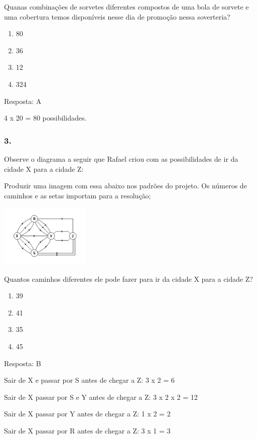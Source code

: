 Quanas combinações de sorvetes diferentes compostos de uma bola de
sorvete e uma cobertura temos disponíveis nesse dia de promoção nessa
soverteria?

\begin{enumerate}
\def\labelenumi{\alph{enumi})}
\item
  80
\item
  36
\item
  12
\item
  324
\end{enumerate}

Resposta: A

4 x 20 = 80 possibilidades.

\subsubsection{3.}\label{section-142}

Observe o diagrama a seguir que Rafael criou com as possibilidades de ir
da cidade X para a cidade Z:

Produzir uma imagem com essa abaixo nos padrões do projeto. \textbar{}Os
números de caminhos e as setas importam para a resolução;

\includegraphics[width=1.68348in,height=1.18344in]{media/image141.png}

Quantos caminhos diferentes ele pode fazer para ir da cidade X para a
cidade Z?

\begin{enumerate}
\def\labelenumi{\alph{enumi})}
\item
  39
\item
  41
\item
  35
\item
  45
\end{enumerate}

Resposta: B

Sair de X e passar por S antes de chegar a Z: 3 x 2 = 6

Sair de X passar por S e Y antes de chegar a Z: 3 x 2 x 2 = 12

Sair de X passar por Y antes de chegar a Z: 1 x 2 = 2

Sair de X passar por R antes de chegar a Z: 3 x 1 = 3

